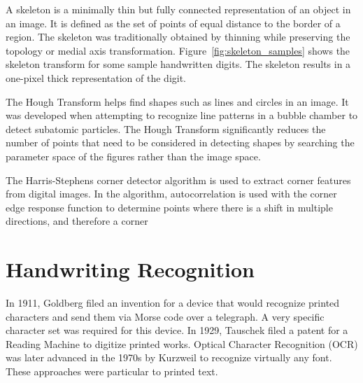 A skeleton is a minimally thin but fully connected representation of an object
in an image. It is defined as the set of points of equal distance to the border
of a region. The skeleton was traditionally obtained by thinning while
preserving the topology or medial axis transformation\cite{LEE1994,
gonzalez2018image}. Figure~\ref{fig:skeleton_samples} shows the skeleton transform
for some sample handwritten digits. The skeleton results in a one-pixel thick
representation of the digit.

The Hough Transform helps find shapes such as lines and circles in an image. It
was developed when attempting to recognize line patterns in a bubble chamber to
detect subatomic particles. The Hough Transform significantly reduces the number
of points that need to be considered in detecting shapes by searching the
parameter space of the figures rather than the image space\cite{hough1962method,
illingworth1988survey, princen1992formal}.

The Harris-Stephens corner detector algorithm is used to extract corner features
from digital images.  In the algorithm, autocorrelation is used with the corner
edge response function to determine points where there is a shift in multiple
directions, and therefore a corner\cite{harris1988combined}


\section{Handwriting Recognition}


In 1911, Goldberg filed an invention for a device\cite{goldberg1911} that would
recognize printed characters and send them via Morse code over a telegraph. A
very specific character set was required for this device. In 1929, Tauschek
filed a patent for a Reading Machine\cite{tauschek1929} to digitize printed
works. Optical Character Recognition (OCR) was later advanced in the 1970s by
Kurzweil to recognize virtually any font. These approaches were particular to
printed text.

